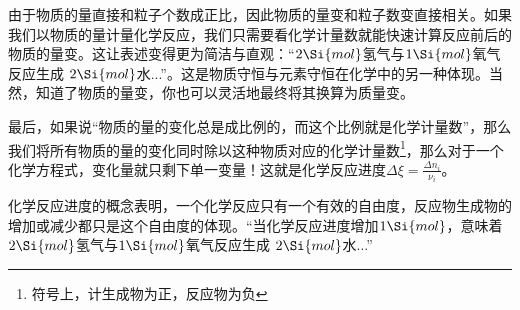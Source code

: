 由于物质的量直接和粒子个数成正比，因此物质的量变和粒子数变直接相关。如果我们以物质的量计量化学反应，我们只需要看化学计量数就能快速计算反应前后的物质的量变。这让表述变得更为简洁与直观：“$2\Si{mol}$氢气与$1\Si{mol}$氧气反应生成 $2\Si{mol}$水...”。这是物质守恒与元素守恒在化学中的另一种体现。当然，知道了物质的量变，你也可以灵活地最终将其换算为质量变。

最后，如果说“物质的量的变化总是成比例的，而这个比例就是化学计量数”，那么我们将所有物质的量的变化同时除以这种物质对应的化学计量数\footnote{符号上，计生成物为正，反应物为负}，那么对于一个化学方程式，变化量就只剩下单一变量！这就是化学反应进度$\Delta \xi = \frac{\Delta n_i}{\nu_i}$。

化学反应进度的概念表明，一个化学反应只有一个有效的自由度，反应物生成物的增加或减少都只是这个自由度的体现。“当化学反应进度增加$1\Si{mol}$，意味着$2\Si{mol}$氢气与$1\Si{mol}$氧气反应生成 $2\Si{mol}$水...”
